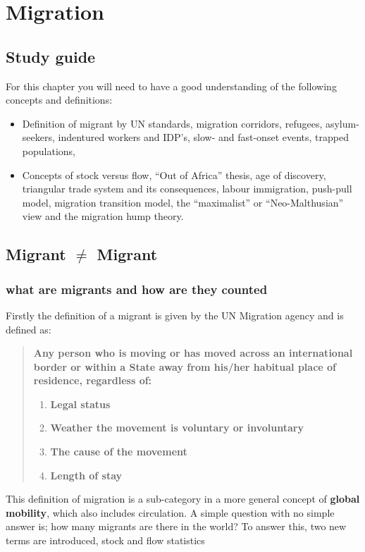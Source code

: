 \documentclass[../summary.tex]{subfiles}
\begin{document}
	
	\section{Migration}
	
	\subsection{Study guide}
	For this chapter you will need to have a good understanding of the following concepts and definitions:
	\begin{itemize}
		\item Definition of migrant by UN standards, migration corridors, refugees, asylum-seekers, indentured workers and IDP's, slow- and fast-onset events, trapped populations, 
		\item Concepts of stock versus flow, ``Out of Africa'' thesis, age of discovery, triangular trade system and its consequences, labour immigration, push-pull model, migration transition model, the ``maximalist'' or ``Neo-Malthusian'' view and the migration hump theory.
	\end{itemize}
	
	\subsection{Migrant $\neq$ Migrant}
	\subsubsection{what are migrants and how are they counted}
	Firstly the definition of a migrant is given by the UN Migration agency and is defined as:
	\begin{quote}
		\textbf{Any person who is moving or has moved across an international border or within a State away from his/her habitual place of residence, regardless of:}
		\begin{enumerate}
			\item\textbf{ Legal status}
			\item \textbf{Weather the movement is voluntary or involuntary}
			\item \textbf{The cause of the movement}
			\item  \textbf{Length of stay}
		\end{enumerate}
	\end{quote}
	This definition of migration is a sub-category in a more general concept of \textbf{global mobility}, which also includes  circulation. A simple question with no simple answer is; how many migrants are  there in the world? To answer this, two new terms are introduced, stock and flow statistics
	
\end{document}
